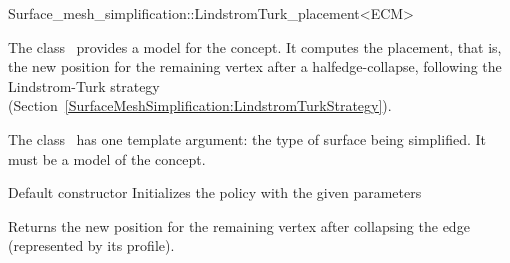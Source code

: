 

\begin{ccRefClass}{Surface_mesh_simplification::LindstromTurk_placement<ECM>}


\ccDefinition

The class \ccRefName\ provides a model for the  concept. 
It computes the placement, that is, the new position for the remaining vertex after
a halfedge-collapse, following the Lindstrom-Turk strategy
(Section~\ref{SurfaceMeshSimplification:LindstromTurkStrategy}).

The class \ccRefName\ has one template argument: the type of surface being simplified. 
It must be a model of the  concept.


\ccIsModel
{}

\ccCreation
{}  %
{Default constructor} 
\ccGlue
{}
{Initializes the policy with the given parameters} 

  {Returns the new position for the remaining vertex after collapsing the edge
  (represented by its profile).}

\ccSeeAlso
{}\\
\\
\end{ccRefClass}


